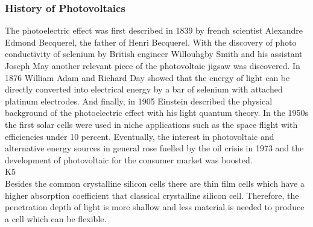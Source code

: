 \subsubsection{History of Photovoltaics}
The photoelectric effect was first described in 1839 by french scientist Alexandre Edmond Becquerel\cite{becquerel1839memoire}, the father of Henri Becquerel. 
With the discovery of 
photo conductivity of selenium
by British engineer Willouhgby Smith and his assistant Joseph May another relevant piece of the photovoltaic jigsaw was discovered. 
In 1876 William Adam and Richard Day showed that 
the energy of light can be directly converted into electrical energy by a bar of selenium with attached platinum electrodes.
And finally, in 1905 Einstein described the physical background of the photoelectric effect with his light quantum theory\cite{einstein1905erzeugung}.
In the 1950s the first solar cells were used in niche applications such as the space flight with efficiencies under 10 percent. 
Eventually, the interest in photovoltaic and alternative energy sources in general rose fuelled by the oil crisis in 1973 
and the development of photovoltaic for the consumer market was boosted. \\

K5\\
Besides the common crystalline silicon cells 
there are thin film cells 
which have a higher absorption coefficient that classical crystalline silicon cell. 
Therefore, the penetration depth of light is more shallow and less material is needed to produce a cell which can be flexible.

